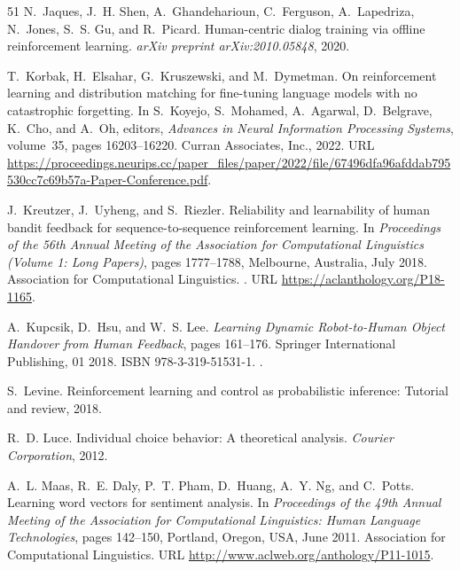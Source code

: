 \begin{thebibliography}{51}
N.~Jaques, J.~H. Shen, A.~Ghandeharioun, C.~Ferguson, A.~Lapedriza, N.~Jones,
  S.~S. Gu, and R.~Picard.
\newblock Human-centric dialog training via offline reinforcement learning.
\newblock \emph{arXiv preprint arXiv:2010.05848}, 2020.

T.~Korbak, H.~Elsahar, G.~Kruszewski, and M.~Dymetman.
\newblock On reinforcement learning and distribution matching for fine-tuning
  language models with no catastrophic forgetting.
\newblock In S.~Koyejo, S.~Mohamed, A.~Agarwal, D.~Belgrave, K.~Cho, and A.~Oh,
  editors, \emph{Advances in Neural Information Processing Systems}, volume~35,
  pages 16203--16220. Curran Associates, Inc., 2022.
\newblock URL
  \url{https://proceedings.neurips.cc/paper_files/paper/2022/file/67496dfa96afddab795530cc7c69b57a-Paper-Conference.pdf}.

J.~Kreutzer, J.~Uyheng, and S.~Riezler.
\newblock Reliability and learnability of human bandit feedback for
  sequence-to-sequence reinforcement learning.
\newblock In \emph{Proceedings of the 56th Annual Meeting of the Association
  for Computational Linguistics (Volume 1: Long Papers)}, pages 1777--1788,
  Melbourne, Australia, July 2018. Association for Computational Linguistics.
\newblock {}.
\newblock URL \url{https://aclanthology.org/P18-1165}.

A.~Kupcsik, D.~Hsu, and W.~S. Lee.
\newblock \emph{Learning Dynamic Robot-to-Human Object Handover from Human
  Feedback}, pages 161--176.
\newblock Springer International Publishing, 01 2018.
\newblock ISBN 978-3-319-51531-1.
\newblock {}.

S.~Levine.
\newblock Reinforcement learning and control as probabilistic inference:
  Tutorial and review, 2018.

R.~D. Luce.
\newblock Individual choice behavior: A theoretical analysis.
\newblock \emph{Courier Corporation}, 2012.

A.~L. Maas, R.~E. Daly, P.~T. Pham, D.~Huang, A.~Y. Ng, and C.~Potts.
\newblock Learning word vectors for sentiment analysis.
\newblock In \emph{Proceedings of the 49th Annual Meeting of the Association
  for Computational Linguistics: Human Language Technologies}, pages 142--150,
  Portland, Oregon, USA, June 2011. Association for Computational Linguistics.
\newblock URL \url{http://www.aclweb.org/anthology/P11-1015}.


\end{thebibliography}
